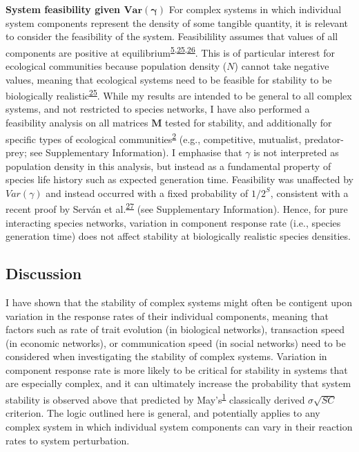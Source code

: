\documentclass[]{article}
\begin{document}
\textbf{System feasibility given \(\mathbf{Var(\gamma)}\)} For complex
systems in which individual system components represent the density of
some tangible quantity, it is relevant to consider the feasibility of
the system. Feasibilility assumes that values of all components are
positive at
equilibrium\textsuperscript{\protect\hyperlink{ref-Grilli2017}{5},\protect\hyperlink{ref-Dougoud2018}{25},\protect\hyperlink{ref-Song2018}{26}}.
This is of particular interest for ecological communities because
population density (\(N\)) cannot take negative values, meaning that
ecological systems need to be feasible for stability to be biologically
realistic\textsuperscript{\protect\hyperlink{ref-Dougoud2018}{25}}.
While my results are intended to be general to all complex systems, and
not restricted to species networks, I have also performed a feasibility
analysis on all matrices \(\mathbf{M}\) tested for stability, and
additionally for specific types of ecological
communities\textsuperscript{\protect\hyperlink{ref-Allesina2012}{2}}
(e.g., competitive, mutualist, predator-prey; see Supplementary
Information). I emphasise that \(\gamma\) is not interpreted as
population density in this analysis, but instead as a fundamental
property of species life history such as expected generation time.
Feasibility was unaffected by \(Var(\gamma)\) and instead occurred with
a fixed probability of \(1/2^{S}\), consistent with a recent proof by
Serván et al.\textsuperscript{\protect\hyperlink{ref-Servan2018}{27}}
(see Supplementary Information). Hence, for pure interacting species
networks, variation in component response rate (i.e., species generation
time) does not affect stability at biologically realistic species
densities.

\subsection{Discussion}\label{discussion}

I have shown that the stability of complex systems might often be
contigent upon variation in the response rates of their individual
components, meaning that factors such as rate of trait evolution (in
biological networks), transaction speed (in economic networks), or
communication speed (in social networks) need to be considered when
investigating the stability of complex systems. Variation in component
response rate is more likely to be critical for stability in systems
that are especially complex, and it can ultimately increase the
probability that system stability is observed above that predicted by
May's\textsuperscript{\protect\hyperlink{ref-May1972}{1}} classically
derived \(\sigma \sqrt{SC}\) criterion. The logic outlined here is
general, and potentially applies to any complex system in which
individual system components can vary in their reaction rates to system
perturbation.
\end{document}

